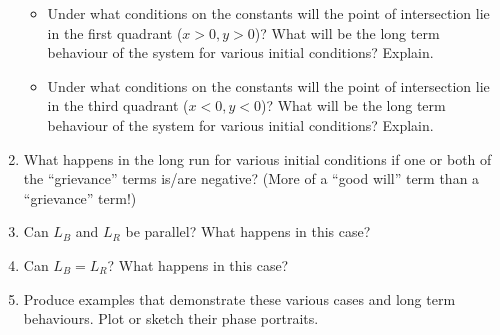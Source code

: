 \begin{enumerate}[label=\emph{(\alph*)}]
\begin{itemize}

\item Under what conditions on the constants will the point of intersection lie in the first quadrant ($x>0, y>0$)? What will be the long term behaviour of the system for various initial conditions? Explain.



\item Under what conditions on the constants will the point of intersection lie in the third quadrant ($x<0, y<0$)? What will be the long term behaviour of the system for various initial conditions? Explain.



\end{itemize}


\item What happens in the long run for various initial conditions if one or both of the ``grievance'' terms is/are negative? (More of a ``good will'' term than a ``grievance'' term!)



\item Can $L_B$ and $L_R$ be parallel? What happens in this case?

\item Can $L_B = L_R$? What happens in this case?

\item Produce examples that demonstrate these various cases and long term behaviours. Plot or sketch their phase portraits.
\end{enumerate}

